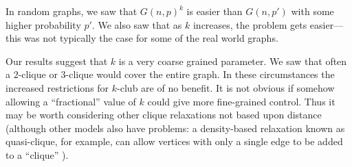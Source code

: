 \documentclass[letterpaper]{article}
\begin{document}
In random graphs, we saw that $G(n, p)^k$ is easier than $G(n, p')$ with some higher probability
$p'$. We also saw that as $k$ increases, the problem gets easier---this was not typically the case
for some of the real world graphs.

Our results suggest that $k$ is a very coarse grained parameter. We saw that often a $2$-clique or
$3$-clique would cover the entire graph. In these circumstances the increased restrictions for
$k$-club are of no benefit. It is not obvious if somehow allowing a ``fractional'' value of $k$
could give more fine-grained control. Thus it may be worth considering other clique relaxations not
based upon distance (although other models also have problems: a density-based relaxation known as
quasi-clique, for example, can allow vertices with only a single edge to be added to a ``clique''
\cite{Abello:2002}).



\end{document}
